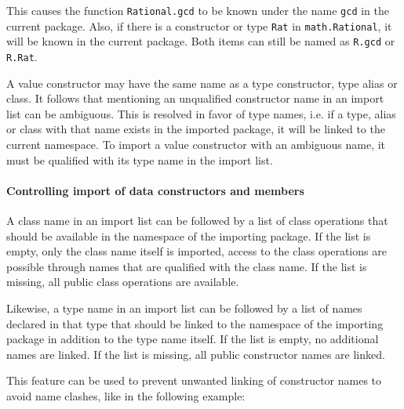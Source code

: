 
This causes the function {\tt Rational.gcd} to be known under the
name {\tt gcd} in the current package. Also, if there is a constructor
or type {\tt Rat} in {\tt math.Rational}, it will be known in the
current package. Both items can still be named as {\tt R.gcd} or {\tt
R.Rat}.

A value constructor may have the same name as a type constructor, type alias or class. 
It follows that mentioning an unqualified constructor name in an import list can be ambiguous. 
This is resolved in favor of type names, i.e. if a type, alias  or class with that name exists in the imported package, 
it will be linked to the current namespace. 
To import a value constructor with an ambiguous name, it must be qualified with its type name in the import list.

\paragraph*{Controlling import of data constructors and members}

A class name in an import list can be followed by a list of class operations that should be available in the namespace of the importing package. If the list is empty, only the class name itself is imported, access to the class operations are possible through names that are qualified with the class name. If the list is missing, all public class operations are available. 

Likewise, a type name in an import list can be followed by a list of names declared in that type that should be linked to the namespace of the importing package in addition to the type name itself. If the list is empty, no additional names are linked. If the list is missing, all public constructor names are linked.

This feature can be used to prevent unwanted linking of constructor names to avoid name clashes, like in the following example:

